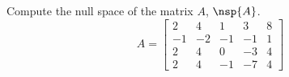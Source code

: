 Compute the null space of the matrix $A$, $\nsp{A}$.
%
\begin{equation*}
A=
\begin{bmatrix}
 2 & 4 & 1 & 3 & 8 \\
 -1 & -2 & -1 & -1 & 1 \\
 2 & 4 & 0 & -3 & 4 \\
 2 & 4 & -1 & -7 & 4
\end{bmatrix}
\end{equation*}
%